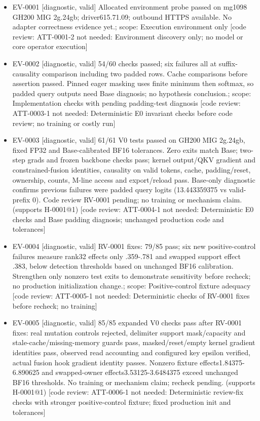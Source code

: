 \documentclass[11pt]{article}
\begin{document}
\begin{itemize}
\item EV-0001 [diagnostic, valid] Allocated environment probe passed on mg1098 GH200 MIG 2g.24gb; driver615.71.09; outbound HTTPS available. No adapter correctness evidence yet.; scope: Execution environment only [code review: ATT-0001-2 not needed: Environment discovery only; no model or core operator execution]
\item EV-0002 [diagnostic, valid] 54/60 checks passed; six failures all at suffix-causality comparison including two padded rows. Cache comparisons before assertion passed. Pinned eager masking uses finite minimum then softmax, so padded query outputs need Base diagnosis; no hypothesis conclusion.; scope: Implementation checks with pending padding-test diagnosis [code review: ATT-0003-1 not needed: Deterministic E0 invariant checks before code review; no training or costly run]
\item EV-0003 [diagnostic, valid] 61/61 V0 tests passed on GH200 MIG 2g.24gb, fixed FP32 and Base-calibrated BF16 tolerances. Zero exits match Base; two-step grads and frozen backbone checks pass; kernel output/QKV gradient and constrained-fusion identities, causality on valid tokens, cache, padding/reset, ownership, counts, M-line access and export/reload pass. Base-only diagnostic confirms previous failures were padded query logits (13.443359375 vs valid-prefix 0). Code review RV-0001 pending; no training or mechanism claim. (supports H-0001@1) [code review: ATT-0004-1 not needed: Deterministic E0 checks and Base padding diagnosis; unchanged production code and tolerances]
\item EV-0004 [diagnostic, valid] RV-0001 fixes: 79/85 pass; six new positive-control failures measure rank32 effects only .359-.781 and swapped support effect .383, below detection thresholds based on unchanged BF16 calibration. Strengthen only nonzero test exits to demonstrate sensitivity before recheck; no production initialization change.; scope: Positive-control fixture adequacy [code review: ATT-0005-1 not needed: Deterministic checks of RV-0001 fixes before recheck; no training]
\item EV-0005 [diagnostic, valid] 85/85 expanded V0 checks pass after RV-0001 fixes: real mutation controls rejected, delimiter support mask/capacity and stale-cache/missing-memory guards pass, masked/reset/empty kernel gradient identities pass, observed read accounting and configured key epsilon verified, actual fusion hook gradient identity passes. Nonzero fixture effects1.84375-6.890625 and swapped-owner effects3.53125-3.6484375 exceed unchanged BF16 thresholds. No training or mechanism claim; recheck pending. (supports H-0001@1) [code review: ATT-0006-1 not needed: Deterministic review-fix checks with stronger positive-control fixture; fixed production init and tolerances]

\end{itemize}
\end{document}
